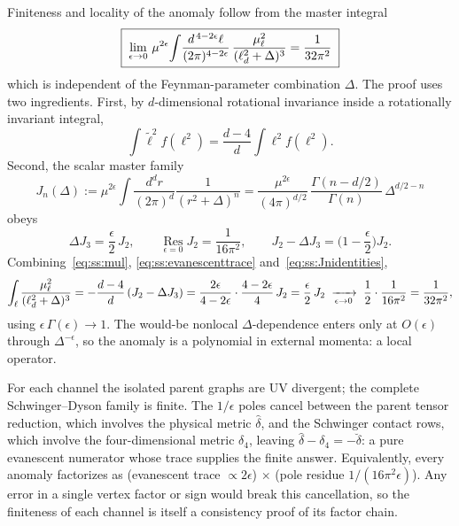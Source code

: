 Finiteness and locality of the anomaly follow from the master integral
\begin{equation}\label{eq:ss:masterintegral}
\boxed{\;
\lim_{\epsilon\to0}\,
\mu^{2\epsilon}\!\int\!\frac{d^{\,4-2\epsilon}\ell}{(2\pi)^{4-2\epsilon}}\,
\frac{\mu_\ell^{2}}{(\ell_d^{2}+\Delta)^{3}}
=\frac{1}{32\pi^{2}}\;}
\end{equation}
which is independent of the Feynman-parameter combination $\Delta$. The proof
uses two ingredients. First, by $d$-dimensional rotational invariance inside a
rotationally invariant integral,
\begin{equation}\label{eq:ss:evanescenttrace}
\int \widetilde\ell^{2} f(\ell^{2})
=\frac{d-4}{d}\int \ell^{2} f(\ell^{2}) .
\end{equation}
Second, the scalar master family
\begin{equation}\label{eq:ss:Jn}
J_n(\Delta)
:=\mu^{2\epsilon}\!\int\!\frac{d^{d}r}{(2\pi)^{d}}\frac1{(r^{2}+\Delta)^{n}}
=\frac{\mu^{2\epsilon}}{(4\pi)^{d/2}}\,
\frac{\Gamma(n-d/2)}{\Gamma(n)}\,\Delta^{d/2-n}
\end{equation}
obeys
\begin{equation}\label{eq:ss:Jnidentities}
\Delta J_3=\frac{\epsilon}{2}\,J_2,
\qquad
\operatorname*{Res}_{\epsilon=0}J_2=\frac{1}{16\pi^{2}},
\qquad
J_2-\Delta J_3=\Big(1-\frac{\epsilon}{2}\Big)J_2 .
\end{equation}
Combining~\eqref{eq:ss:mul}, \eqref{eq:ss:evanescenttrace}
and~\eqref{eq:ss:Jnidentities},
\begin{equation}\label{eq:ss:masterproof}
\int_{\ell}\frac{\mu_\ell^{2}}{(\ell_d^{2}+\Delta)^{3}}
=-\frac{d-4}{d}\,(J_2-\Delta J_3)
=\frac{2\epsilon}{4-2\epsilon}\cdot\frac{4-2\epsilon}{4}\,J_2
=\frac{\epsilon}{2}\,J_2
\;\xrightarrow[\epsilon\to0]{}\;
\frac12\cdot\frac{1}{16\pi^{2}}
=\frac{1}{32\pi^{2}},
\end{equation}
using $\epsilon\,\Gamma(\epsilon)\to1$. The would-be nonlocal
$\Delta$-dependence enters only at $O(\epsilon)$ through $\Delta^{-\epsilon}$,
so the anomaly is a polynomial in external momenta: a local operator.

\begin{remark}%
\label{rem:ss:polebookkeeping}
For each channel the isolated parent graphs are UV divergent; the complete
Schwinger--Dyson family is finite. The $1/\epsilon$ poles cancel between the
parent tensor reduction, which involves the physical metric $\widehat\delta$,
and the Schwinger contact rows, which involve the four-dimensional metric
$\delta_4$, leaving $\widehat\delta-\delta_4=-\breve\delta$: a pure evanescent
numerator whose trace supplies the finite answer. Equivalently, every anomaly
factorizes as (evanescent trace $\propto2\epsilon$) $\times$ (pole residue
$1/(16\pi^{2}\epsilon)$). Any error in a single vertex factor or sign would
break this cancellation, so the finiteness of each channel is itself a
consistency proof of its factor chain.
\end{remark}


